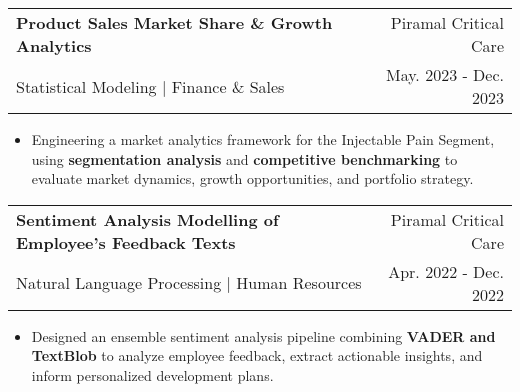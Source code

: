 \documentclass[letter paper,11pt]{article}
\makeatletter
\newcommand{\resumeItem}[1]{
\justifying
\vspace{-2.89pt}
  \item\small{
    {#1}
  }
}
\newcommand{\resumeProjectHeading}[4]{
    \vspace{-10pt}
    \item
    \begin{tabular*}{1\textwidth}{l@{\extracolsep{\fill}}r}
      {\small#1} & {\small#2} \\
      {\small#3} & {\small#4}
    \end{tabular*}\vspace{-14pt}
}
\newcommand{\resumeItemListStart}{\begin{itemize}}
\newcommand{\resumeItemListEnd}{\end{itemize}}
\makeatother
\begin{document}
    
     \resumeProjectHeading
          {\textbf{Product Sales Market Share \& Growth Analytics}}
          {Piramal Critical Care}
          {Statistical Modeling $|$ Finance \& Sales}
          {May. 2023 - Dec. 2023}
          
          \resumeItemListStart
            \resumeItem{Engineering a market analytics framework for the Injectable Pain Segment, using \textbf{segmentation analysis} and \textbf{competitive benchmarking} to evaluate market dynamics, growth opportunities, and portfolio strategy.}
          \resumeItemListEnd

      
           \resumeProjectHeading
          {\textbf{Sentiment Analysis Modelling of Employee's Feedback Texts}}
          {Piramal Critical Care}
          {Natural Language Processing $|$ Human Resources}
          {Apr. 2022 - Dec. 2022}
          
          \resumeItemListStart
            \resumeItem{Designed an ensemble sentiment analysis pipeline combining \textbf{VADER and TextBlob} to analyze employee feedback, extract actionable insights, and inform personalized development plans.}
          \resumeItemListEnd
          
    
          
      


          

          
\end{document}
